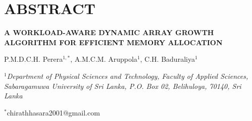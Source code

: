 \chapter*{ABSTRACT}

\begin{center}
{\bfseries A WORKLOAD-AWARE DYNAMIC ARRAY GROWTH ALGORITHM FOR EFFICIENT MEMORY ALLOCATION \par}
\vspace{0.3cm}
{\small P.M.D.C.H. Perera$^{1,*}$, A.M.C.M. Aruppola$^{1}$, C.H. Baduraliya$^{1}$ \par}
\vspace{0.2cm}
{\small\itshape $^{1}$Department of Physical Sciences and Technology, Faculty of Applied Sciences, Sabaragamuwa University of Sri Lanka, P.O. Box 02, Belihuloya, 70140, Sri Lanka \par}
{\small $^{*}$chirathhasara2001@gmail.com \par}
\end{center}

\vspace{0.5cm}

